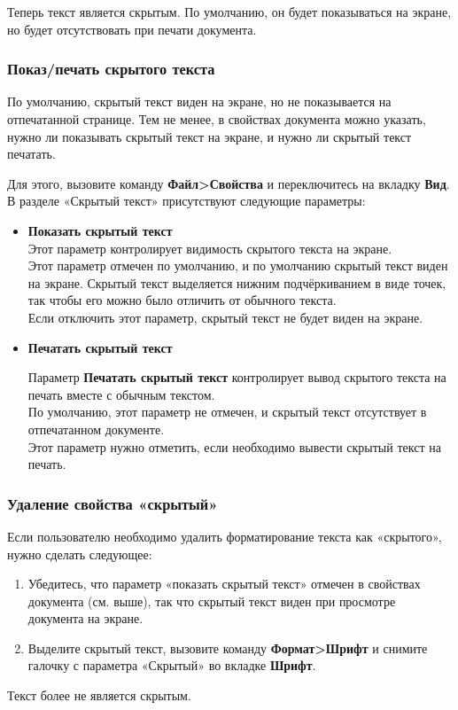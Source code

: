 ﻿\documentclass[a4paper,10pt]{article}
\begin{document}
Теперь текст является скрытым. По умолчанию, он будет показываться на экране, но будет отсутствовать при печати документа.

\subsubsection{Показ/печать скрытого текста}
По умолчанию, скрытый текст виден на экране, но не показывается на отпечатанной странице. Тем не менее, в свойствах документа можно указать, нужно ли показывать скрытый текст на экране, и нужно ли скрытый текст печатать.

Для этого, вызовите команду \textbf{Файл>Свойства} и переключитесь на вкладку \textbf{Вид}. В разделе «Скрытый текст» присутствуют следующие параметры:
\begin{itemize}
 \item \textbf{Показать скрытый текст}\\
Этот параметр контролирует видимость скрытого текста на экране.\\
Этот параметр отмечен по умолчанию, и по умолчанию скрытый текст виден на экране. Скрытый текст выделяется нижним подчёркиванием в виде точек, так чтобы его можно было отличить от обычного текста.\\
Если отключить этот параметр, скрытый текст не будет виден на экране.
\item \textbf{Печатать скрытый текст}

Параметр \textbf{Печатать скрытый текст} контролирует вывод скрытого текста на печать вместе с обычным текстом.\\
По умолчанию, этот параметр не отмечен, и скрытый текст отсутствует в отпечатанном документе.\\
Этот параметр нужно отметить, если необходимо вывести скрытый текст на печать.
\end{itemize}

\subsubsection{Удаление свойства «скрытый»}
Если пользователю необходимо удалить форматирование текста как «скрытого», нужно сделать следующее:
\begin{enumerate}
 \item Убедитесь, что параметр «показать скрытый текст» отмечен в свойствах документа (см. выше), так что скрытый текст виден при просмотре документа на экране.
 \item Выделите скрытый текст, вызовите команду \textbf{Формат>Шрифт} и снимите галочку с параметра «Скрытый» во вкладке \textbf{Шрифт}.
\end{enumerate}
Текст  более не является скрытым.
\end{document}
